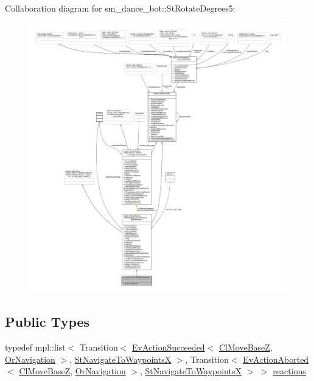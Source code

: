 Collaboration diagram for sm\+\_\+dance\+\_\+bot\+:\+:St\+Rotate\+Degrees5\+:
\nopagebreak
\begin{figure}[H]
\begin{center}
\leavevmode
\includegraphics[width=350pt]{structsm__dance__bot_1_1StRotateDegrees5__coll__graph}
\end{center}
\end{figure}
\subsection*{Public Types}
\begin{DoxyCompactItemize}
\item 
typedef mpl\+::list$<$ Transition$<$ \hyperlink{structsmacc_1_1default__events_1_1EvActionSucceeded}{Ev\+Action\+Succeeded}$<$ \hyperlink{classcl__move__base__z_1_1ClMoveBaseZ}{Cl\+Move\+BaseZ}, \hyperlink{classsm__dance__bot_1_1OrNavigation}{Or\+Navigation} $>$, \hyperlink{structsm__dance__bot_1_1StNavigateToWaypointsX}{St\+Navigate\+To\+WaypointsX} $>$, Transition$<$ \hyperlink{structsmacc_1_1default__events_1_1EvActionAborted}{Ev\+Action\+Aborted}$<$ \hyperlink{classcl__move__base__z_1_1ClMoveBaseZ}{Cl\+Move\+BaseZ}, \hyperlink{classsm__dance__bot_1_1OrNavigation}{Or\+Navigation} $>$, \hyperlink{structsm__dance__bot_1_1StNavigateToWaypointsX}{St\+Navigate\+To\+WaypointsX} $>$ $>$ \hyperlink{structsm__dance__bot_1_1StRotateDegrees5_a4a656e380d1f371b16d3daf9361cdf23}{reactions}
\end{DoxyCompactItemize}
